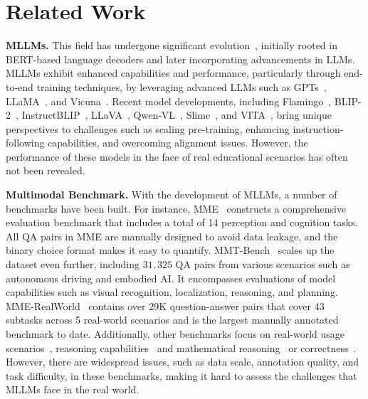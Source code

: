 \section{Related Work}
\textbf{MLLMs.} 
This field has undergone significant evolution~\cite{yin2023survey, fu2023challenger,zhang2024debiasing,fu2024mme}, initially rooted in BERT-based language decoders and later incorporating advancements in LLMs. 
MLLMs exhibit enhanced capabilities and performance, particularly through end-to-end training techniques, by leveraging advanced LLMs such as GPTs~\cite{gpt4,brown2020language},
LLaMA~\cite{touvron2023llama,touvron2023llama2},  and Vicuna~\cite{chiang2023vicuna}. Recent model developments, including Flamingo~\cite{awadalla2023openflamingo}, BLIP-2~\cite{li2023blip}, InstructBLIP~\cite{dai2024instructblip}, LLaVA~\cite{liu2023visual}, Qwen-VL~\cite{bai2023qwen}, Slime~\cite{zhang2024beyond}, and VITA~\cite{fu2024vita}, bring unique perspectives to challenges such as scaling pre-training, enhancing instruction-following capabilities, and overcoming alignment issues. 
However, the performance of these models in the face of real educational scenarios has often not been revealed.

\textbf{Multimodal Benchmark.} 
With the development of MLLMs, a number of benchmarks have been built.
For instance, MME~\cite{fu2023mme} constructs a comprehensive evaluation benchmark that includes a total of 14 perception and cognition tasks. All QA pairs in MME are manually designed to avoid data leakage, and the binary choice format makes it easy to quantify.
MMT-Bench~\cite{mmtbench} scales up the dataset even further, including $31,325$ QA pairs from various scenarios such as autonomous driving and embodied AI. It encompasses evaluations of model capabilities such as visual recognition, localization, reasoning, and planning.
MME-RealWorld~\cite{zhang2024mme} contains over 29K question-answer pairs that cover 43 subtasks across 5 real-world scenarios and is the largest manually annotated benchmark to date. 
Additionally, other benchmarks focus on real-world usage scenarios~\cite{fu2024blink,bitton2023visit}, reasoning capabilities~\cite{yu2024mm,han2023coremm} and mathematical reasoning~\cite{lu2024mathvista} or correctness~\cite{yan2024errorradar}. 
However, there are widespread issues, such as data scale, annotation quality, and task difficulty, in these benchmarks, making it hard to assess the challenges that MLLMs face in the real world.

